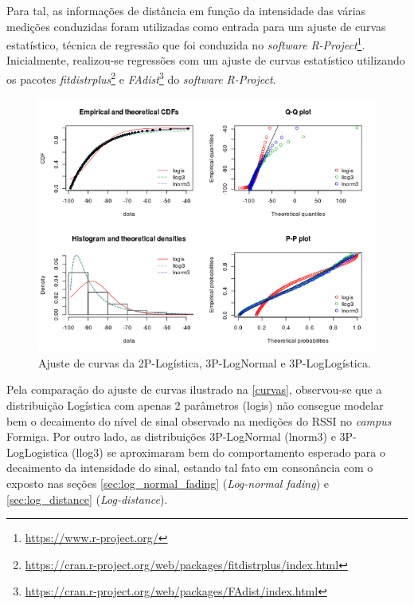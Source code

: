 \documentclass[
	12pt,				%
	twoside,			%
	a4paper,			%
	english,			%
	french,				%
	spanish,			%
	brazil				%
	]{abntex2}
\begin{document}
Para tal, as informações de distância em função da intensidade das
várias medições conduzidas foram utilizadas como entrada para um ajuste
de curvas estatístico, técnica de regressão que foi conduzida no
\emph{software} \emph{R-Project}\footnote{\url{https://www.r-project.org/}}.
Inicialmente, realizou-se regressões com um ajuste de curvas estatístico
utilizando os pacotes \emph{fitdistrplus}\footnote{\url{https://cran.r-project.org/web/packages/fitdistrplus/index.html}}
e \emph{FAdist}\footnote{\url{https://cran.r-project.org/web/packages/FAdist/index.html}}
do \emph{software} \emph{R-Project}.

\begin{figure}[htb]
    \caption{\label{curvas} Ajuste de curvas da 2P-Logística, 3P-LogNormal e 3P-LogLogística.}
    \begin{center}
        \includegraphics[scale=0.8]{imagens/curvas.jpg}
    \end{center}
\end{figure}

Pela comparação do ajuste de curvas ilustrado na \autoref{curvas},
observou-se que a distribuição Logística com apenas 2 parâmetros (logis)
não consegue modelar bem o decaimento do nível de sinal observado na
medições do RSSI no \emph{campus} Formiga. Por outro lado, as
distribuições 3P-LogNormal (lnorm3) e 3P-LogLogistica (llog3) se
aproximaram bem do comportamento esperado para o decaimento da
intensidade do sinal, estando tal fato em consonância com o exposto nas
seções \ref{sec:log_normal_fading} (\emph{Log-normal fading}) e
\ref{sec:log_distance} (\emph{Log-distance}).
\end{document}
